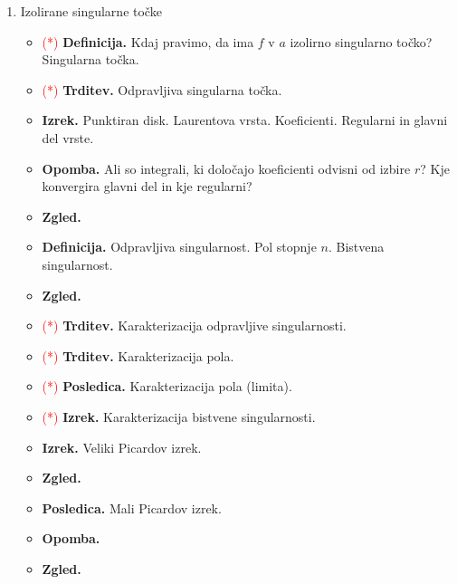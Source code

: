 \begin{enumerate}
    \item Izolirane singularne točke
    \begin{itemize}
        \item \textcolor{red}{(*)} \textbf{Definicija.} Kdaj pravimo, da ima \(f\) v \(a\) izolirno singularno točko? Singularna točka.
        \item \textcolor{red}{(*)} \textbf{Trditev.} Odpravljiva singularna točka.
        \item \textbf{Izrek.} Punktiran disk. Laurentova vrsta. Koeficienti. Regularni in glavni del vrste.
        \item \textbf{Opomba.} Ali so integrali, ki določajo koeficienti odvisni od izbire \(r\)? Kje konvergira glavni del in kje regularni?
        \item \textbf{Zgled.} 
        \item \textbf{Definicija.} Odpravljiva singularnost. Pol stopnje \(n\). Bistvena singularnost.
        \item \textbf{Zgled.} 
        \item \textcolor{red}{(*)} \textbf{Trditev.} Karakterizacija odpravljive singularnosti.
        \item \textcolor{red}{(*)} \textbf{Trditev.} Karakterizacija pola.
        \item \textcolor{red}{(*)} \textbf{Posledica.} Karakterizacija pola (limita).
        \item \textcolor{red}{(*)} \textbf{Izrek.} Karakterizacija bistvene singularnosti.
        \item \textbf{Izrek.} Veliki Picardov izrek.
        \item \textbf{Zgled.} \todo{}
        \item \textbf{Posledica.} Mali Picardov izrek.
        \item \textbf{Opomba.} 
        \item \textbf{Zgled.} \todo{} 
    \end{itemize}


\end{enumerate}

